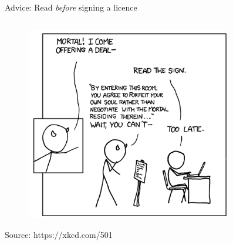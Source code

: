 \documentclass[10pt]{beamer}
\begin{document}
\begin{frame}{Advice: Read \emph{before} signing a licence}
\begin{columns}
\hspace{-60pt}
	\begin{column}{0.6\linewidth}
		\begin{figure}
    		\centering
  			\includegraphics[trim={0pt 0pt 0pt 0pt}, clip, width=\columnwidth]{images/xkcdlicence}
        \end{figure}
        \hfill \tiny{Source: https://xkcd.com/501}
    \end{column}
\hspace{-50pt}
    \begin{column}{0.2\linewidth}
        \begin{figure}
    	    \centering

\end{figure}
\end{column}
\end{columns}
\end{frame}
\end{document}
